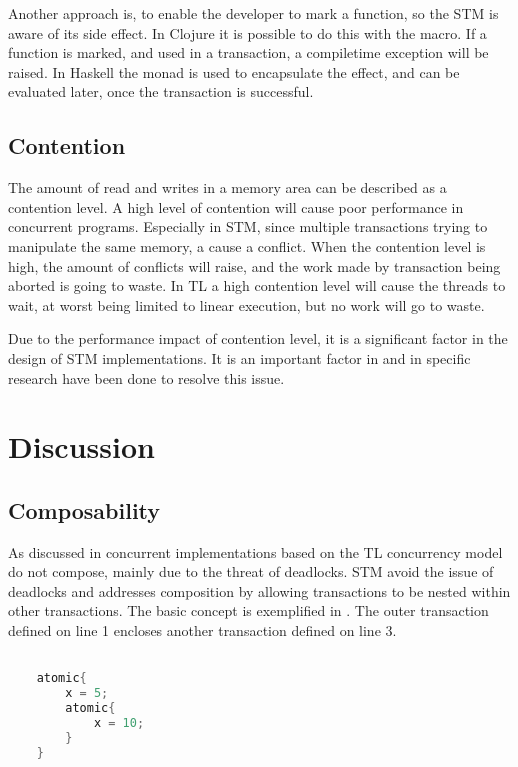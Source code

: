 Another approach is, to enable the developer to mark a function, so the \ac{STM} is aware of its side effect. In Clojure it is possible to do this with the  macro. If a function is marked, and used in a transaction, a compiletime exception will be raised. In Haskell the  monad is used to encapsulate the effect, and can be evaluated later, once the transaction is successful.

\subsection{Contention}
The amount of read and writes in a memory area can be described as a contention level\cite[p. 2084]{herlihy2011tm}. A high level of contention will cause poor performance in concurrent programs. Especially in \ac{STM}, since multiple transactions trying to manipulate the same memory, a cause a conflict. When the contention level is high, the amount of conflicts will raise, and the work made by transaction being aborted is going to waste. In \ac{TL} a high contention level will cause the threads to wait, at worst being limited to linear execution, but no work will go to waste. 

Due to the performance impact of contention level, it is a significant factor in the design of \ac{STM} implementations. It is an important factor in \cite{harris2003language} and in \cite{herlihy2008transactional} specific research have been done to resolve this issue.

\section{Discussion}
\label{sec:stm_discussion}

\subsection{Composability}
\label{sec:stm_composability}
As discussed in  concurrent implementations based on the \ac{TL} concurrency model do not compose, mainly due to the threat of deadlocks. \ac{STM} avoid the issue of deadlocks and addresses composition by allowing transactions to be nested within other transactions. The basic concept is exemplified in . The outer transaction defined on line 1 encloses another transaction defined on line 3.

\begin{lstlisting}[label=lst:stm_nested_transactions,
  caption={Nested transactions},
  language=Java,  
  showspaces=false,
  showtabs=false,
  breaklines=true,
  showstringspaces=false,
  breakatwhitespace=true,
  commentstyle=\color{greencomments},
  keywordstyle=\color{bluekeywords},
  stringstyle=\color{redstrings},
  morekeywords={atomic, retry, orElse, var}]  % Start your code-block

	atomic{
		x = 5;
		atomic{
			x = 10;		
		}
	}
       
\end{lstlisting}

